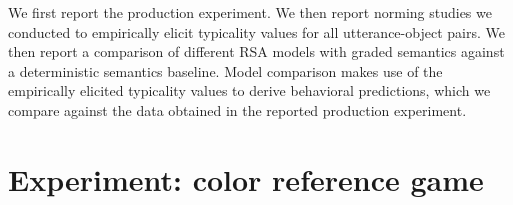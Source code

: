 \documentclass[10pt,letterpaper]{article}
\begin{document}
We first report the production experiment. We then report norming studies we conducted to empirically elicit typicality values for all utterance-object pairs. We then report a comparison of different RSA models with graded semantics against a deterministic semantics baseline. Model comparison makes use of the empirically elicited typicality values to derive behavioral predictions, which we compare against the data obtained in the reported production experiment.


\section{Experiment: color reference game}
\end{document}
